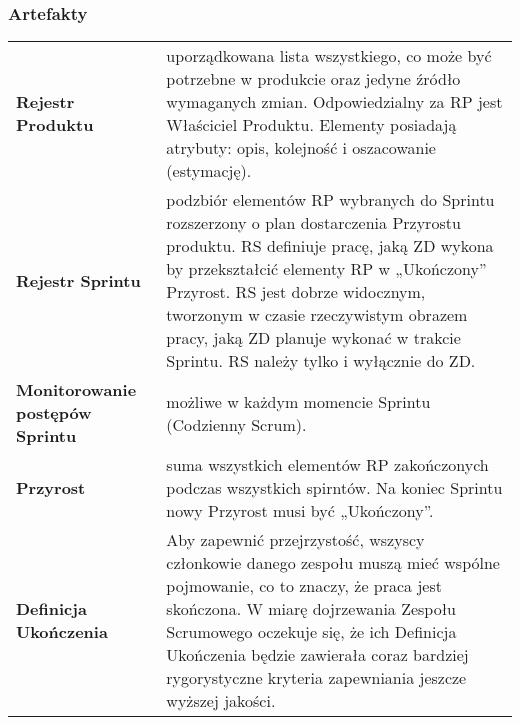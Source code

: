 \documentclass[../main.tex]{subfiles}
\begin{document}
    \subsubsection{Artefakty}
    \begin{table}[H]
        \begin{center}
            \begin{tabular}{ p{} p{} }
                \textbf{Rejestr Produktu}
                &
                uporządkowana lista wszystkiego,
                co może być potrzebne w produkcie oraz jedyne źródło wymaganych zmian.
                Odpowiedzialny za RP jest Właściciel Produktu.
                Elementy posiadają atrybuty: opis, kolejność i oszacowanie (estymację).
                \\

                \cmidrule(r){1-1}\cmidrule(l){2-2}
                \textbf{Rejestr Sprintu}
                &
                podzbiór elementów RP wybranych do Sprintu rozszerzony o plan
                dostarczenia Przyrostu produktu.
                RS definiuje pracę, jaką ZD wykona by przekształcić elementy
                RP w „Ukończony” Przyrost.
                RS jest dobrze widocznym, tworzonym w czasie rzeczywistym obrazem pracy, jaką ZD planuje wykonać w trakcie Sprintu.
                RS należy tylko i wyłącznie do ZD.
                \\

                \cmidrule(r){1-1}\cmidrule(l){2-2}
                \textbf{Monitorowanie postępów Sprintu}
                &
                możliwe w każdym momencie Sprintu (Codzienny Scrum).
                \\

                \cmidrule(r){1-1}\cmidrule(l){2-2}
                \textbf{Przyrost}
                &
                suma wszystkich elementów RP zakończonych podczas wszystkich spirntów.
                Na koniec Sprintu nowy Przyrost musi być „Ukończony”.
                \\

                \cmidrule(r){1-1}\cmidrule(l){2-2}
                \textbf{Definicja Ukończenia}
                &
                Aby zapewnić przejrzystość, wszyscy członkowie danego zespołu muszą mieć wspólne
                pojmowanie, co to znaczy, że praca jest skończona. W miarę dojrzewania Zespołu Scrumowego oczekuje się, że ich Definicja Ukończenia będzie
                zawierała coraz bardziej rygorystyczne kryteria zapewniania jeszcze wyższej jakości.
                \\
            \end{tabular}
        \end{center}
    \end{table}
\end{document}
